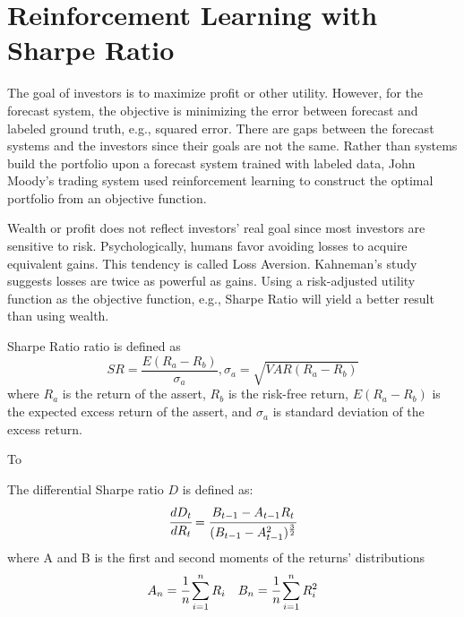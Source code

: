 \section{Reinforcement Learning with Sharpe Ratio}
The goal of investors is to maximize profit or other utility. However, for the forecast system, the objective is minimizing the error between forecast and labeled ground truth, e.g., squared error. There are gaps between the forecast systems and the investors since their goals are not the same.
Rather than systems build the portfolio upon a forecast system trained with labeled data, John Moody's trading system used reinforcement learning to construct the optimal portfolio from an objective function\cite{618952,moody1998performance}.
\par
Wealth or profit does not reflect investors' real goal since most investors are sensitive to risk. Psychologically, humans favor avoiding losses to acquire equivalent gains. This tendency is called Loss Aversion.\cite{kahneman2000analysis} Kahneman's study suggests losses are twice as powerful as gains\cite{Tversky1992}. Using a risk-adjusted utility function as the objective function, e.g., Sharpe Ratio will yield a better result than using wealth.
\par
Sharpe Ratio ratio is defined as 
\[ SR = \frac{E(R_a - R_b)}{\sigma_a},
\sigma_a = \sqrt{VAR(R_a-R_b)}\]
where \(R_a\) is the return of the assert, 
\(R_b\) is the risk-free return,
\(E(R_a - R_b)\) is the expected excess return of the assert,
and \(\sigma_a\) is standard deviation of the excess return.
\par
To 




The differential Sharpe ratio \(D\) is defined as:
\[
\cfrac{d D_t}{d R_t} = 
\cfrac{B_{t-1}-A_{t-1} R_t}{(B_{t-1}-A_{t-1}^2)^\frac{3}{2}}
\]
where
A and B is the first and second moments of the returns' distributions
\[ A_n = \cfrac{1}{n}\sum_{i=1}^nR_i\quad
B_n = \cfrac{1}{n}\sum_{i=1}^nR_i^2
\]